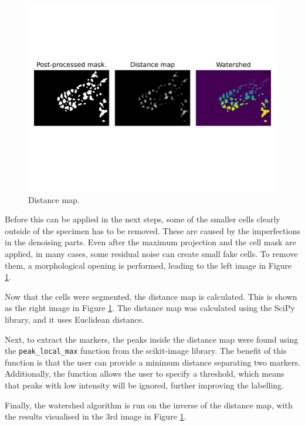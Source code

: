 \documentclass[
  digital,     %
  oneside,     %
  nosansbold,  %
  nocolorbold, %
  lof,         %
  lot,         %
]{fithesis4}
\begin{document}
\begin{figure}
    \begin{center}
        \includegraphics[width=\linewidth]{resources/distance_map.png}
    \end{center}
    \caption{Distance map.}
    \label{fig:distance_map}
\end{figure}

Before this can be applied in the next steps, some of the smaller cells clearly
outside of the specimen has to be removed. These are caused by the imperfections
in the denoising parts. Even after the maximum projection and the cell mask are
applied, in many cases, some residual noise can create small fake cells. To
remove them, a morphological opening is performed, leading to the left image in
Figure \ref{fig:distance_map}.

Now that the cells were segmented, the distance map is calculated. This is shown
as the right image in Figure \ref{fig:distance_map}. The distance map was
calculated using the SciPy library, and it uses Euclidean distance.

Next, to extract the markers, the peaks inside the distance map were found using
the \texttt{peak\_local\_max} function from the scikit-image library. The benefit of
this function is that the user can provide a minimum distance separating two
markers. Additionally, the function allows the user to specify a threshold, which
means that peaks with low intensity will be ignored, further improving the
labelling.

Finally, the watershed algorithm is run on the inverse of the distance map, with the results
visualised in the 3rd image in Figure \ref{fig:distance_map}.
\end{document}
